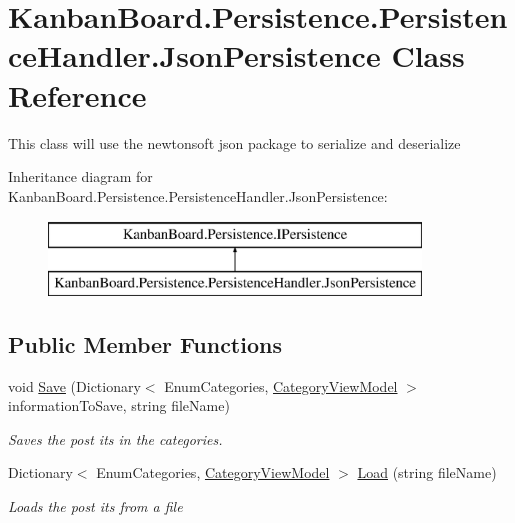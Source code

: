 \hypertarget{class_kanban_board_1_1_persistence_1_1_persistence_handler_1_1_json_persistence}{}\section{Kanban\+Board.\+Persistence.\+Persistence\+Handler.\+Json\+Persistence Class Reference}
\label{class_kanban_board_1_1_persistence_1_1_persistence_handler_1_1_json_persistence}


This class will use the newtonsoft json package to serialize and deserialize  


Inheritance diagram for Kanban\+Board.\+Persistence.\+Persistence\+Handler.\+Json\+Persistence\+:\begin{figure}[H]
\begin{center}
\leavevmode
\includegraphics[height=2.000000cm]{class_kanban_board_1_1_persistence_1_1_persistence_handler_1_1_json_persistence}
\end{center}
\end{figure}
\subsection*{Public Member Functions}
\begin{DoxyCompactItemize}
\item 
void \hyperlink{class_kanban_board_1_1_persistence_1_1_persistence_handler_1_1_json_persistence_a925b52aa9fac036eaa854ab9f3be1e88}{Save} (Dictionary$<$ Enum\+Categories, \hyperlink{class_kanban_board_1_1_view_model_1_1_category_view_model}{Category\+View\+Model} $>$ information\+To\+Save, string file\+Name)
\begin{DoxyCompactList}\small\item\em Saves the post its in the categories. \end{DoxyCompactList}\item 
Dictionary$<$ Enum\+Categories, \hyperlink{class_kanban_board_1_1_view_model_1_1_category_view_model}{Category\+View\+Model} $>$ \hyperlink{class_kanban_board_1_1_persistence_1_1_persistence_handler_1_1_json_persistence_a03590c4676da93617e2b6738e22f5844}{Load} (string file\+Name)
\begin{DoxyCompactList}\small\item\em Loads the post its from a file \end{DoxyCompactList}\end{DoxyCompactItemize}



